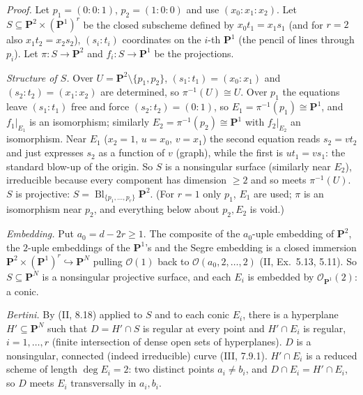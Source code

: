 \documentclass[11pt]{article}
\begin{document}
\emph{Proof.} Let $p_1=(0:0:1)$, $p_2=(1:0:0)$ and use $(x_0:x_1:x_2)$. Let $S\subseteq\mathbf P^2\times(\mathbf P^1)^r$ be the closed subscheme defined by $x_0t_1=x_1s_1$ (and for $r=2$ also $x_1t_2=x_2s_2$), $(s_i:t_i)$ coordinates on the $i$-th $\mathbf P^1$ (the pencil of lines through $p_i$). Let $\pi:S\to\mathbf P^2$ and $f_i:S\to\mathbf P^1$ be the projections.

\emph{Structure of $S$.} Over $U=\mathbf P^2\setminus\{p_1,p_2\}$, $(s_1:t_1)=(x_0:x_1)$ and $(s_2:t_2)=(x_1:x_2)$ are determined, so $\pi^{-1}(U)\cong U$. Over $p_1$ the equations leave $(s_1:t_1)$ free and force $(s_2:t_2)=(0:1)$, so $E_1=\pi^{-1}(p_1)\cong\mathbf P^1$, and $f_1|_{E_1}$ is an isomorphism; similarly $E_2=\pi^{-1}(p_2)\cong\mathbf P^1$ with $f_2|_{E_2}$ an isomorphism. Near $E_1$ ($x_2=1$, $u=x_0$, $v=x_1$) the second equation reads $s_2=vt_2$ and just expresses $s_2$ as a function of $v$ (graph), while the first is $ut_1=vs_1$: the standard blow-up of the origin. So $S$ is a nonsingular surface (similarly near $E_2$), irreducible because every component has dimension $\ge2$ and so meets $\pi^{-1}(U)$. $S$ is projective: $S=\operatorname{Bl}_{\{p_1,\dots,p_r\}}\mathbf P^2$. (For $r=1$ only $p_1$, $E_1$ are used; $\pi$ is an isomorphism near $p_2$, and everything below about $p_2,E_2$ is void.)

\emph{Embedding.} Put $a_0=d-2r\ge1$. The composite of the $a_0$-uple embedding of $\mathbf P^2$, the $2$-uple embeddings of the $\mathbf P^1$'s and the Segre embedding is a closed immersion $\mathbf P^2\times(\mathbf P^1)^r\hookrightarrow\mathbf P^N$ pulling $\mathcal O(1)$ back to $\mathcal O(a_0,2,\dots,2)$ (II, Ex.~5.13, 5.11). So $S\subseteq\mathbf P^N$ is a nonsingular projective surface, and each $E_i$ is embedded by $\mathcal O_{\mathbf P^1}(2)$: a conic.

\emph{Bertini.} By (II, 8.18) applied to $S$ and to each conic $E_i$, there is a hyperplane $H'\subseteq\mathbf P^N$ such that $D=H'\cap S$ is regular at every point and $H'\cap E_i$ is regular, $i=1,\dots,r$ (finite intersection of dense open sets of hyperplanes). $D$ is a nonsingular, connected (indeed irreducible) curve (III, 7.9.1). $H'\cap E_i$ is a reduced scheme of length $\deg E_i=2$: two distinct points $a_i\ne b_i$, and $D\cap E_i=H'\cap E_i$, so $D$ meets $E_i$ transversally in $a_i,b_i$.
\end{document}
